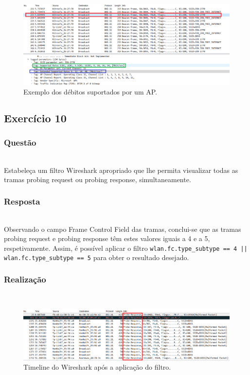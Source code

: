 \documentclass{llncs}
\begin{document}
\begin{figure}
  \begin{center}
  \includegraphics[scale=0.35]{imagens/beacon_rates.png} 
  \end{center}
  \caption{Exemplo dos débitos suportados por um AP.}
  \label{fig:beacon_rates}
\end{figure}


\clearpage
\subsection{Exercício 10}
\subsubsection{Questão}\rule[-10pt]{0pt}{10pt}\\

Estabeleça um filtro Wireshark apropriado que lhe permita visualizar todas as tramas probing request ou probing response, simultaneamente.

\subsubsection{Resposta}\rule[-10pt]{0pt}{10pt}\\

Observando o campo Frame Control Field das tramas, conclui-se que as tramas probing request e probing response têm estes valores iguais a 4 e a 5, respetivamente. Assim, é possível aplicar o filtro \texttt{wlan.fc.type\_subtype == 4 || wlan.fc.type\_subtype == 5} para obter o resultado desejado.

\subsubsection{Realização}\rule[-10pt]{0pt}{10pt}\\

\begin{figure}
  \begin{center}
  \includegraphics[scale=0.35]{imagens/probe_filter.png} 
  \end{center}
  \caption{Timeline do Wireshark após a aplicação do filtro.}
  \label{fig:probe_filter}
\end{figure}
\end{document}
